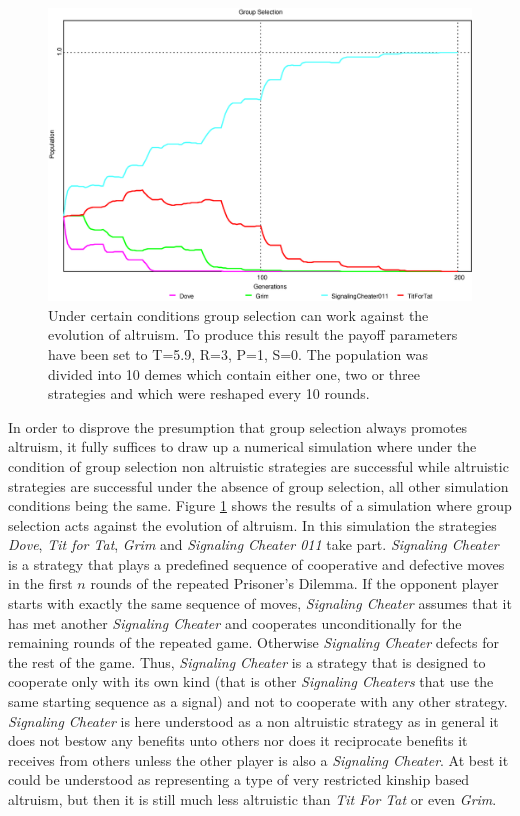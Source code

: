 \begin{figure}
\begin{center}
\includegraphics[width=20cm]{images/group_selection3.eps} %
\caption{\label{groupSelection3} Under certain conditions group selection can
work against the evolution of altruism. To produce this result the payoff
parameters have been set to T=5.9, R=3, P=1, S=0. The population was divided
into 10 demes which contain either one, two or three strategies and which were
reshaped every 10 rounds.}
\end{center}
\end{figure}


In order to disprove the presumption that group selection always promotes
altruism, it fully suffices to draw up a numerical simulation where under the
condition of group selection non altruistic strategies are successful while
altruistic strategies are successful under the absence of group selection, all
other simulation conditions being the same. Figure \ref{groupSelection3} shows
the results of a simulation where group selection acts against the evolution
of altruism. In this simulation the strategies {\em Dove}, {\em Tit for Tat},
{\em Grim} and {\em Signaling Cheater 011} take part. {\em Signaling
  Cheater} is a strategy that plays a predefined sequence of cooperative and
defective moves in the first $n$ rounds of the repeated Prisoner's Dilemma. If
the opponent player starts with exactly the same sequence of moves, {\em
  Signaling Cheater} assumes that it has met another {\em Signaling Cheater}
and cooperates unconditionally for the remaining rounds of the repeated game.
Otherwise {\em Signaling Cheater} defects for the rest of the game. Thus,
{\em Signaling Cheater} is a strategy that is designed to cooperate only with
its own kind (that is other {\em Signaling Cheaters} that use the same
starting sequence as a signal) and not to cooperate with any other strategy.
{\em Signaling Cheater} is here understood as a non altruistic strategy as in
general it does not bestow any benefits unto others nor does it reciprocate
benefits it receives from others unless the other player is also a {\em
Signaling Cheater}. At best it could be understood as representing a type of
very restricted kinship based altruism, but then it is still much less
altruistic than {\em Tit For Tat} or even {\em Grim}.

